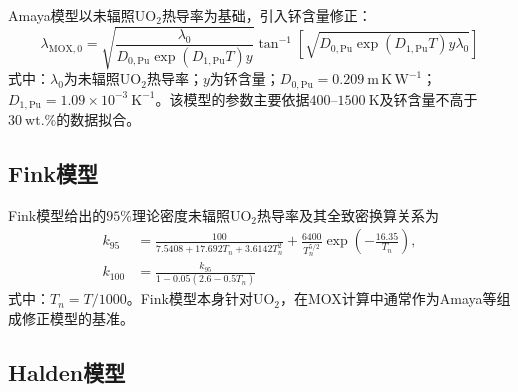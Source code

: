 Amaya模型以未辐照$\mathrm{UO}_2$热导率为基础，引入钚含量修正：
\begin{equation}
	\lambda_{\mathrm{MOX},0}
	=\sqrt{
	\frac{\lambda_0}
	{D_{0,\mathrm{Pu}}\exp(D_{1,\mathrm{Pu}}T)y}}
	\tan^{-1}\!\left[
	\sqrt{D_{0,\mathrm{Pu}}\exp(D_{1,\mathrm{Pu}}T)y\lambda_0}
	\right]
	\label{eq:appendix_amaya_thermal_conductivity}
\end{equation}
\noindent 式中：$\lambda_0$为未辐照$\mathrm{UO}_2$热导率；$y$为钚含量；$D_{0,\mathrm{Pu}}=0.209\ \mathrm{m\,K\,W^{-1}}$；$D_{1,\mathrm{Pu}}=1.09\times10^{-3}\ \mathrm{K^{-1}}$。该模型的参数主要依据$400$--$1500\ \mathrm{K}$及钚含量不高于$30\ \mathrm{wt.\%}$的数据拟合。

\subsection{Fink模型}

Fink模型给出的$95\%$理论密度未辐照$\mathrm{UO}_2$热导率及其全致密换算关系为
\begin{equation}
	\begin{aligned}
		k_{95}
		&=
		\frac{100}{7.5408+17.692T_n+3.6142T_n^2}
		+\frac{6400}{T_n^{5/2}}
		\exp\!\left(-\frac{16.35}{T_n}\right),\\
		k_{100}
		&=
		\frac{k_{95}}
		{1-0.05\left(2.6-0.5T_n\right)}
	\end{aligned}
	\label{eq:appendix_fink_k95}
\end{equation}
\label{eq:appendix_fink_k100}
\noindent 式中：$T_n=T/1000$。Fink模型本身针对$\mathrm{UO}_2$，在MOX计算中通常作为Amaya等组成修正模型的基准。

\subsection{Halden模型}

